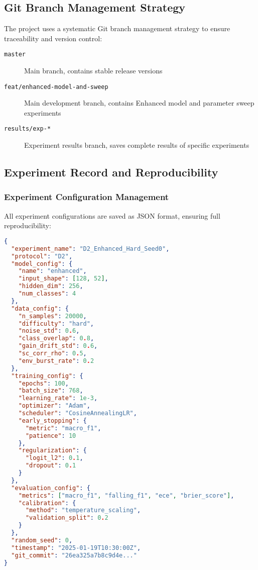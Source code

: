 \subsection{Git Branch Management Strategy}
\label{subsec:git_strategy}

The project uses a systematic Git branch management strategy to ensure traceability and version control:

\begin{description}
\item[\texttt{master}] Main branch, contains stable release versions
\item[\texttt{feat/enhanced-model-and-sweep}] Main development branch, contains Enhanced model and parameter sweep experiments
\item[\texttt{results/exp-*}] Experiment results branch, saves complete results of specific experiments
\end{description}

\subsection{Experiment Record and Reproducibility}
\label{subsec:reproducibility}

\subsubsection{Experiment Configuration Management}
All experiment configurations are saved as JSON format, ensuring full reproducibility:

\begin{lstlisting}[language=json,caption=Example of Experiment Configuration]
{
  "experiment_name": "D2_Enhanced_Hard_Seed0",
  "protocol": "D2",
  "model_config": {
    "name": "enhanced",
    "input_shape": [128, 52],
    "hidden_dim": 256,
    "num_classes": 4
  },
  "data_config": {
    "n_samples": 20000,
    "difficulty": "hard",
    "noise_std": 0.6,
    "class_overlap": 0.8,
    "gain_drift_std": 0.6,
    "sc_corr_rho": 0.5,
    "env_burst_rate": 0.2
  },
  "training_config": {
    "epochs": 100,
    "batch_size": 768,
    "learning_rate": 1e-3,
    "optimizer": "Adam",
    "scheduler": "CosineAnnealingLR",
    "early_stopping": {
      "metric": "macro_f1",
      "patience": 10
    },
    "regularization": {
      "logit_l2": 0.1,
      "dropout": 0.1
    }
  },
  "evaluation_config": {
    "metrics": ["macro_f1", "falling_f1", "ece", "brier_score"],
    "calibration": {
      "method": "temperature_scaling",
      "validation_split": 0.2
    }
  },
  "random_seed": 0,
  "timestamp": "2025-01-19T10:30:00Z",
  "git_commit": "26ea325a7b8c9d4e..."
}
\end{lstlisting}


